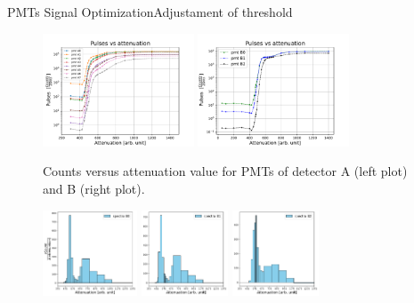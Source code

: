 \documentclass[9pt,a4paper]{beamer}
\begin{document}
\begin{frame}{PMTs Signal Optimization}{Adjustament of threshold}

\begin{figure}
\includegraphics[width = 0.4\textwidth]{figures/AttenuationScanA.pdf}
\includegraphics[width = 0.4\textwidth]{figures/AttenuationScanB.pdf}
\caption{\footnotesize Counts versus attenuation value for PMTs of detector A (left plot) and B (right plot).}
\end{figure}

\begin{figure}
\centering
\includegraphics[width = 0.25\textwidth]{figures/spettro/B0.pdf}
\includegraphics[width = 0.23\textwidth]{figures/spettro/B1.pdf}
\includegraphics[width = 0.23\textwidth]{figures/spettro/B2.pdf}
\end{figure}
\end{frame}
\end{document}
